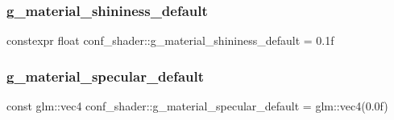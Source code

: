 \subsubsection{\texorpdfstring{g\+\_\+material\+\_\+shininess\+\_\+default}{g\_material\_shininess\_default}}
{\footnotesize\ttfamily constexpr float conf\+\_\+shader\+::g\+\_\+material\+\_\+shininess\+\_\+default = 0.\+1f}

\mbox{\label{namespaceconf__shader_ab528ab684d029b03b166b3e3adce40c3}} 
\subsubsection{\texorpdfstring{g\+\_\+material\+\_\+specular\+\_\+default}{g\_material\_specular\_default}}
{\footnotesize\ttfamily const glm\+::vec4 conf\+\_\+shader\+::g\+\_\+material\+\_\+specular\+\_\+default = glm\+::vec4(0.\+0f)}

